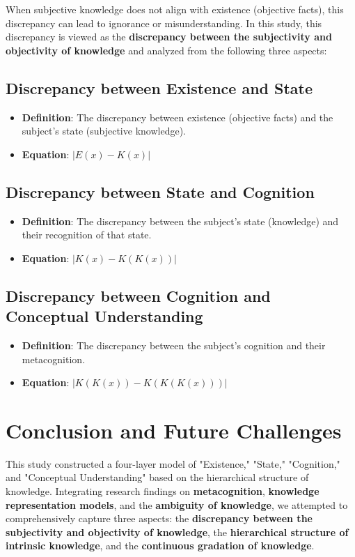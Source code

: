 \documentclass{article}
\begin{document}
When subjective knowledge does not align with existence (objective facts), this discrepancy can lead to ignorance or misunderstanding. In this study, this discrepancy is viewed as the \textbf{discrepancy between the subjectivity and objectivity of knowledge} and analyzed from the following three aspects:

\subsection{Discrepancy between Existence and State}
\begin{itemize}
    \item \textbf{Definition}: The discrepancy between existence (objective facts) and the subject's state (subjective knowledge).
    \item \textbf{Equation}: \( |E(x) - K(x)| \)
\end{itemize}

\subsection{Discrepancy between State and Cognition}
\begin{itemize}
    \item \textbf{Definition}: The discrepancy between the subject's state (knowledge) and their recognition of that state.
    \item \textbf{Equation}: \( |K(x) - K(K(x))| \)
\end{itemize}

\subsection{Discrepancy between Cognition and Conceptual Understanding}
\begin{itemize}
    \item \textbf{Definition}: The discrepancy between the subject's cognition and their metacognition.
    \item \textbf{Equation}: \( |K(K(x)) - K(K(K(x)))| \)
\end{itemize}

\section{Conclusion and Future Challenges}

This study constructed a four-layer model of "Existence," "State," "Cognition," and "Conceptual Understanding" based on the hierarchical structure of knowledge. Integrating research findings on \textbf{metacognition}, \textbf{knowledge representation models}, and the \textbf{ambiguity of knowledge}, we attempted to comprehensively capture three aspects: the \textbf{discrepancy between the subjectivity and objectivity of knowledge}, the \textbf{hierarchical structure of intrinsic knowledge}, and the \textbf{continuous gradation of knowledge}.
\end{document}
